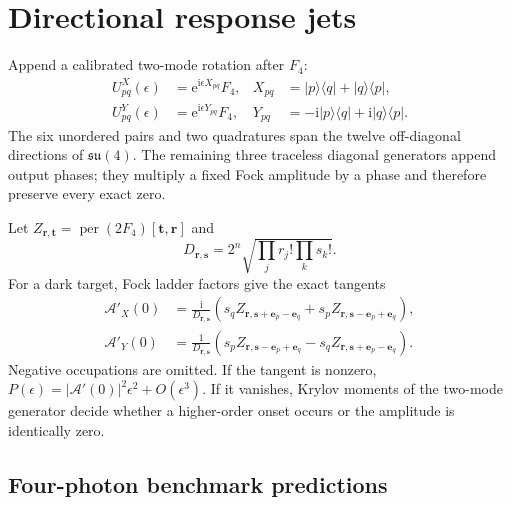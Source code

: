 \documentclass[aps,pra,reprint,amsmath,amssymb,superscriptaddress,longbibliography]{revtex4-2}
\newcommand{\Ffour}{F_{4}}
\newcommand{\ii}{\mathrm{i}}
\newcommand{\ee}{\mathrm{e}}
\newcommand{\per}{\operatorname{per}}
\newcommand{\evec}{\bm e}
\begin{document}
\section{Directional response jets}
\label{sec:jets}

Append a calibrated two-mode rotation after $\Ffour$:
\begin{align}
U^X_{pq}(\epsilon)&=\ee^{\ii\epsilon X_{pq}}\Ffour,
&X_{pq}&=|p\rangle\langle q|+|q\rangle\langle p|,\nonumber\\
U^Y_{pq}(\epsilon)&=\ee^{\ii\epsilon Y_{pq}}\Ffour,
&Y_{pq}&=-\ii|p\rangle\langle q|+\ii|q\rangle\langle p|.
\label{eq:mixers}
\end{align}
The six unordered pairs and two quadratures span the twelve off-diagonal
directions of $\mathfrak{su}(4)$.  The remaining three traceless diagonal
generators append output phases; they multiply a fixed Fock amplitude by a
phase and therefore preserve every exact zero.

Let $Z_{\bm r,\bm t}=\per(2\Ffour)[\bm t,\bm r]$ and
\begin{equation}
D_{\bm r,\bm s}=2^n
\sqrt{\prod_jr_j!\prod_ks_k!}.
\end{equation}
For a dark target, Fock ladder factors give the exact tangents
\begin{align}
\mathcal A'_X(0)
&=\frac{\ii}{D_{\bm r,\bm s}}
\left(s_qZ_{\bm r,\bm s+\evec_p-\evec_q}
+s_pZ_{\bm r,\bm s-\evec_p+\evec_q}\right),
\label{eq:x-tangent}\\
\mathcal A'_Y(0)
&=\frac{1}{D_{\bm r,\bm s}}
\left(s_pZ_{\bm r,\bm s-\evec_p+\evec_q}
-s_qZ_{\bm r,\bm s+\evec_p-\evec_q}\right).
\label{eq:y-tangent}
\end{align}
Negative occupations are omitted.  If the tangent is nonzero,
$P(\epsilon)=|\mathcal A'(0)|^2\epsilon^2+O(\epsilon^3)$.
If it vanishes, Krylov moments of the two-mode generator decide whether a
higher-order onset occurs or the amplitude is identically zero.

\subsection{Four-photon benchmark predictions}
\end{document}
